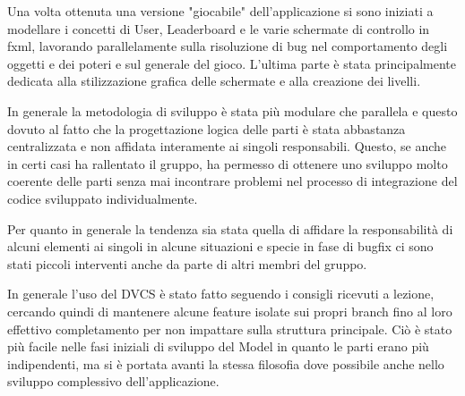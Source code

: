\documentclass[a4paper,12pt]{report}
\begin{document}
Una volta ottenuta una versione "giocabile" dell'applicazione si sono iniziati a modellare i concetti di User, Leaderboard e le varie schermate di controllo in fxml, lavorando parallelamente sulla risoluzione di bug nel comportamento degli oggetti e dei poteri e sul generale del gioco.
L'ultima parte è stata principalmente dedicata alla stilizzazione grafica delle schermate e alla creazione dei livelli.

In generale la metodologia di sviluppo è stata più modulare che parallela e questo dovuto al fatto che la progettazione logica delle parti è stata abbastanza centralizzata e non affidata interamente ai singoli responsabili.
Questo, se anche in certi casi ha rallentato il gruppo, ha permesso di ottenere uno sviluppo molto coerente delle parti senza mai incontrare problemi nel processo di integrazione del codice sviluppato individualmente.

Per quanto in generale la tendenza sia stata quella di affidare la responsabilità di alcuni elementi ai singoli in alcune situazioni e specie in fase di bugfix ci sono stati piccoli interventi anche da parte di altri membri del gruppo.

In generale l'uso del DVCS è stato fatto seguendo i consigli ricevuti a lezione, cercando quindi di mantenere alcune feature isolate sui propri branch fino al loro effettivo completamento per non impattare sulla struttura principale.
Ciò è stato più facile nelle fasi iniziali di sviluppo del Model in quanto le parti erano più indipendenti, ma si è portata avanti la stessa filosofia dove possibile anche nello sviluppo complessivo dell'applicazione.
\end{document}
